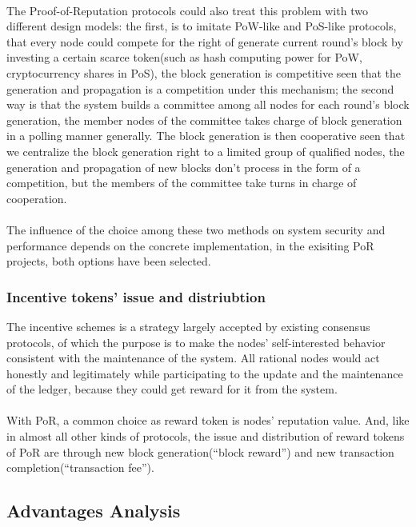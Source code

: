 \documentclass[doublespacing]{bmcart}
\begin{document}
\begin{CJK*}{UTF8}{gbsn}
\paragraph{} The Proof-of-Reputation protocols could also treat this problem with two different design models: the first, is to imitate PoW-like and PoS-like protocols, that every node could compete for the right of generate current round's block by investing a certain scarce token(such as hash computing power for PoW, cryptocurrency shares in PoS), the block generation is competitive seen that the generation and propagation is a competition under this mechanism; the second way is that the system builds a committee among all nodes for each round's block generation, the member nodes of the committee takes charge of block generation in a polling manner generally. The block generation is then cooperative seen that we centralize the block generation right to a limited group of qualified nodes, the generation and propagation of new blocks don't process in the form of a competition, but the members of the committee take turns in charge of cooperation.\paragraph{} The influence of the choice among these two methods on system security and performance depends on the concrete implementation, in the exisiting PoR projects, both options have been selected.
\subsubsection*{Incentive tokens' issue and distriubtion}
The incentive schemes is a strategy largely accepted by existing consensus protocols, of which the purpose is to make the nodes' self-interested behavior consistent with the maintenance of the system. All rational nodes would act honestly and legitimately while participating to the update and the maintenance of the ledger, because they could get reward for it from the system.
\paragraph{} With PoR, a common choice as reward token is nodes' reputation value. And, like in almost all other kinds of protocols, the issue and distribution of reward tokens of PoR are through new block generation(``block reward'') and new transaction completion(``transaction fee'').

\subsection{Advantages Analysis}

\end{CJK*}
\end{document}
